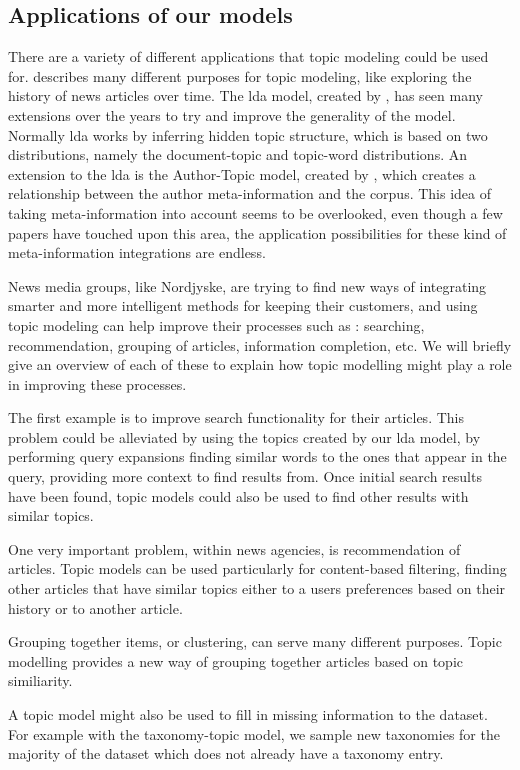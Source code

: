 \subsection{Applications of our models}\label{sec:appendix_applications}
There are a variety of different applications that topic modeling could be used for. 
\citet{Probabilistic_Topic_Models} describes many different purposes for topic modeling, like exploring the history of news articles over time.
The \gls{lda} model, created by \citet{blei2003latent}, has seen many extensions over the years to try and improve the generality of the model.
Normally \gls{lda} works by inferring hidden topic structure, which is based on two distributions, namely the document-topic and topic-word distributions.
An extension to the \gls{lda} is the Author-Topic model, created by \citet{author_topic_2012}, which creates a relationship between the author meta-information and the corpus.
This idea of taking meta-information into account seems to be overlooked, even though a few papers have touched upon this area, the application possibilities for these kind of meta-information integrations are endless.

News media groups, like Nordjyske, are trying to find new ways of integrating smarter and more intelligent methods for keeping their customers, and using topic modeling can help improve their processes such as : searching, recommendation, grouping of articles, information completion, etc.
We will briefly give an overview of each of these to explain how topic modelling might play a role in improving these processes.

The first example is to improve search functionality for their articles.
This problem could be alleviated by using the topics created by our \gls{lda} model, by performing query expansions finding similar words to the ones that appear in the query, providing more context to find results from.
Once initial search results have been found, topic models could also be used to find other results with similar topics.

One very important problem, within news agencies, is recommendation of articles.
Topic models can be used particularly for content-based filtering, finding other articles that have similar topics either to a users preferences based on their history or to another article.

Grouping together items, or clustering, can serve many different purposes. Topic modelling provides a new way of grouping together articles based on topic similiarity.

A topic model might also be used to fill in missing information to the dataset.
For example with the taxonomy-topic model, we sample new taxonomies for the majority of the dataset which does not already have a taxonomy entry.
